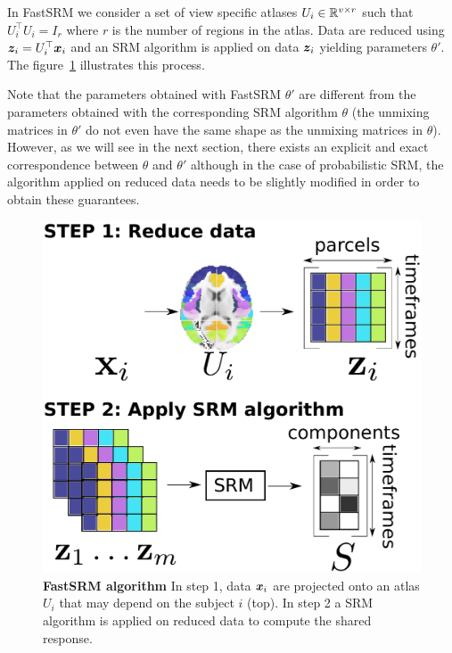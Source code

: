 In FastSRM we consider a set of view specific atlases $U_i \in \mathbb{R}^{v \times r}$ such that
$U_i^{\top}U_i = I_r$ where $r$ is the number of regions in the atlas.
Data are reduced using $\boldsymbol{z}_i = U_i^{\top} \boldsymbol{x}_i$ and an SRM algorithm is applied
on data $\boldsymbol{z}_i$ yielding parameters $\theta'$.
The figure~\ref{fig:srm:conceptual} illustrates this process.

Note that the parameters obtained with FastSRM $\theta'$ are different
from the parameters obtained with the corresponding SRM algorithm $\theta$ (the unmixing matrices in $\theta'$ do not even have the same shape as the unmixing matrices in $\theta$).
However, as we will see in the next section, there exists an explicit and exact
correspondence between $\theta$ and $\theta'$ although in the case of
probabilistic SRM, the algorithm applied on reduced data needs to be slightly modified in order to
obtain these guarantees. 

\begin{figure}
  \centering
  \includegraphics[scale=0.34]{figures/srm/conceptual_figure2.pdf}
  \caption{\textbf{FastSRM algorithm} In step 1, data $\boldsymbol{x}_i$ are projected onto an
    atlas $U_i$ that may depend on the subject $i$ (top). In step 2 a SRM algorithm is applied on reduced data to compute the shared response.}
  \label{fig:srm:conceptual}
\end{figure}

